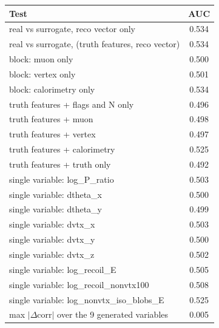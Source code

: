 \begin{tabular}{lc}
\toprule
Test & AUC \\
\midrule
real vs surrogate, reco vector only & 0.534 \\
real vs surrogate, (truth features, reco vector) & 0.534 \\
\midrule
block: muon only & 0.500 \\
block: vertex only & 0.501 \\
block: calorimetry only & 0.534 \\
truth features + flags and N only & 0.496 \\
truth features + muon & 0.498 \\
truth features + vertex & 0.497 \\
truth features + calorimetry & 0.525 \\
truth features + truth only & 0.492 \\
single variable: log\_P\_ratio & 0.503 \\
single variable: dtheta\_x & 0.500 \\
single variable: dtheta\_y & 0.499 \\
single variable: dvtx\_x & 0.503 \\
single variable: dvtx\_y & 0.500 \\
single variable: dvtx\_z & 0.502 \\
single variable: log\_recoil\_E & 0.505 \\
single variable: log\_recoil\_nonvtx100 & 0.508 \\
single variable: log\_nonvtx\_iso\_blobs\_E & 0.525 \\
\midrule
max $|\Delta$corr$|$ over the 9 generated variables & 0.005 \\
\bottomrule
\end{tabular}
